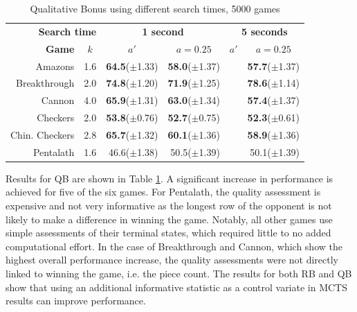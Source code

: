 \documentclass{ecai2014}
\begin{document}
\begin{table}
{\caption{Qualitative Bonus using different search times, 5000 games} \label{tab:qb}}
\begin{center}
\begin{tabular}{rlrrrr}
\hline
\multicolumn{2}{r}{\rule{0pt}{12pt}\textbf{Search time}} & \multicolumn{2}{c}{\textbf{1 second}} & \multicolumn{2}{c}{\textbf{5 seconds}} \\
\cline{1-6}
\rule{0pt}{12pt} \textbf{Game} & \multicolumn{1}{c|}{\textbf{$k$}} 
& \multicolumn{1}{c}{\textbf{$a'$}} & \multicolumn{1}{c}{\textbf{$a = 0.25$}} & \multicolumn{1}{c}{\textbf{$a'$}} & \multicolumn{1}{c}{\textbf{$a = 0.25$}} \\ \hline
Amazons &\multicolumn{1}{l|}{1.6}			& {\bf{64.5}}($\pm$1.33) & {\bf{58.0}}($\pm$1.37) 	&&{\bf{57.7}}($\pm$1.37) \\
Breakthrough &\multicolumn{1}{l|}{2.0} 		& {\bf{74.8}}($\pm$1.20) & {\bf{71.9}}($\pm$1.25) 	&&{\bf{78.6}}($\pm$1.14) \\
Cannon &\multicolumn{1}{l|}{4.0} 			& {\bf{65.9}}($\pm$1.31) & {\bf{63.0}}($\pm$1.34) 	&&{\bf{57.4}}($\pm$1.37) \\
Checkers &\multicolumn{1}{l|}{2.0}			& {\bf{53.8}}($\pm$0.76) & {\bf{52.7}}($\pm$0.75) 	&&{\bf{52.3}}($\pm$0.61) \\
Chin. Checkers &\multicolumn{1}{l|}{2.8} 	& {\bf{65.7}}($\pm$1.32) & {\bf{60.1}}($\pm$1.36) 	&&{\bf{58.9}}($\pm$1.36) \\
Pentalath &\multicolumn{1}{l|}{1.6} 		& 46.6($\pm$1.38) 	     & 50.5($\pm$1.39) 			&&50.1($\pm$1.39) \\
\hline
\end{tabular}
\end{center}
\end{table}

Results for QB are shown in Table \ref{tab:qb}. A significant increase in performance is achieved for five of the six games. For Pentalath, the quality assessment is expensive and not very informative as the longest row of the opponent is not likely to make a difference in winning the game. Notably, all other games use simple assessments of their terminal states, which required little to no added computational effort. In the case of Breakthrough and Cannon, which show the highest overall performance increase, the quality assessments were not directly linked to winning the game, i.e. the piece count. The results for both RB and QB show that using an additional informative statistic as a control variate in MCTS results can improve performance.
\end{document}
